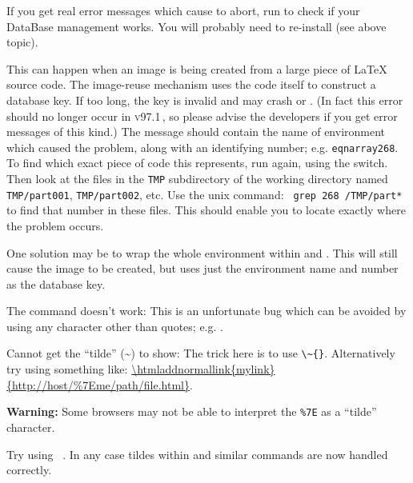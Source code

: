 \begin{htmllist}
\begin{changebar}
If you get real error messages which cause \latextohtml{} to abort,
run  to check if your DataBase management works.
You will probably need to re-install  (see above topic).
\end{changebar}


\begin{changebar}
This can happen when an image is being created from a large piece
of \LaTeX{} source code. The image-reuse mechanism uses the code itself
to construct a database key. If too long, the key is invalid and may
crash  or . (In fact this error should no longer
occur in \textsc{v97.1}\,, so please advise the \latextohtml{} developers if
you get error messages of this kind.)\html{\\}
The message should contain the name of environment which caused the problem,
along with an identifying number; e.g. \texttt{eqnarray268}.
To find which exact piece of code this represents, run \latextohtml{}
again, using the  switch. Then look at the files
in the \texttt{TMP} subdirectory of the working directory
named \texttt{TMP/part001}, \texttt{TMP/part002}, etc.
Use the unix  command: \texttt{ grep 268 }\texttt{/TMP/part* }
to find that number in these files.
This should enable you to locate exactly where the problem occurs.

One solution may be to wrap the whole environment within
 and .
This will still cause the image to be created,
but uses just the environment name and number as the database key.
\end{changebar}%



\item [The \Lc{verb"ABC"} command doesn't work: ]
This is an unfortunate bug which can be avoided by using
any character other than quotes; e.g. .

\item [Cannot get the ``tilde'' (\~{}) to show: \hfill]
The trick here is to use \verb|\~{}|.\html{\\}
Alternatively try using something like:
\url{\htmladdnormallink{mylink}{http://host/\%7Eme/path/file.html}}.

\textbf{Warning:} Some browsers may not be able to interpret the \verb|%7E|
as a ``tilde'' character.

\begin{changebar}
Try using ~.
In any case tildes within  and similar commands
are now handled correctly.
\end{changebar}


\end{htmllist}
